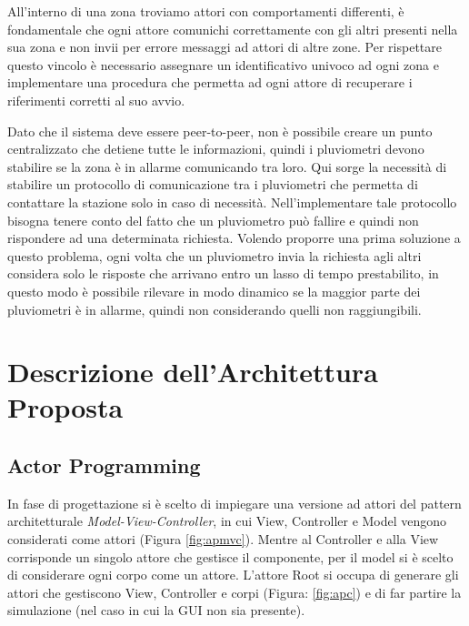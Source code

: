 \documentclass[12pt,a4paper,openright,twoside]{book}
\begin{document}
All'interno di una zona troviamo attori con comportamenti differenti, è fondamentale che ogni attore comunichi correttamente con gli altri presenti nella sua zona e non invii per errore messaggi ad attori di altre zone. Per rispettare questo vincolo è necessario assegnare un identificativo univoco ad ogni zona e implementare una procedura che permetta ad ogni attore di recuperare i riferimenti corretti al suo avvio.

Dato che il sistema deve essere peer-to-peer, non è possibile creare un punto centralizzato che detiene tutte le informazioni, quindi i pluviometri devono stabilire se la zona è in allarme comunicando tra loro. Qui sorge la necessità di stabilire un protocollo di comunicazione tra i pluviometri che permetta di contattare la stazione solo in caso di necessità. Nell'implementare tale protocollo bisogna tenere conto del fatto che un pluviometro può fallire e quindi non rispondere ad una determinata richiesta. Volendo proporre una prima soluzione a questo problema, ogni volta che un pluviometro invia la richiesta agli altri considera solo le risposte che arrivano entro un lasso di tempo prestabilito, in questo modo è possibile rilevare in modo dinamico se la maggior parte dei pluviometri è in allarme, quindi non considerando quelli non raggiungibili.
\chapter{Descrizione dell'Architettura Proposta}
\label{chap:Descrizione dell'Architettura Proposta}
\section{Actor Programming}
In fase di progettazione si è scelto di impiegare una versione ad attori del pattern architetturale \textit{Model-View-Controller}, in cui View, Controller e Model vengono considerati come attori (Figura \ref{fig:apmvc}).
Mentre al Controller e alla View corrisponde un singolo attore che gestisce il componente, per il model si è scelto di considerare ogni corpo come un attore.
L'attore Root si occupa di generare gli attori che gestiscono View, Controller e corpi (Figura: \ref{fig:apc}) e di far partire la simulazione (nel caso in cui la GUI non sia presente).
\end{document}
